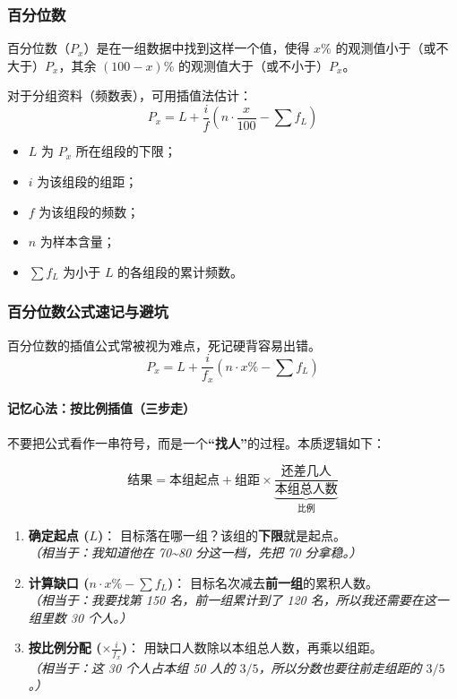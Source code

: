 \documentclass[lang=cn,10pt]{elegantbook}
\begin{document}
\subsubsection{百分位数}

百分位数（$P_x$）是在一组数据中找到这样一个值，使得 $x\%$ 的观测值小于（或不大于）$P_x$，其余 $(100-x)\%$ 的观测值大于（或不小于）$P_x$。

对于分组资料（频数表），可用插值法估计：
\begin{equation}
P_x=L+\frac{i}{f}\left(n\cdot\frac{x}{100}-\sum f_L\right)
\end{equation}

\begin{itemize}
\item $L$ 为 $P_x$ 所在组段的下限；
\item $i$ 为该组段的组距；
\item $f$ 为该组段的频数；
\item $n$ 为样本含量；
\item $\sum f_L$ 为小于 $L$ 的各组段的累计频数。
\end{itemize}

\subsubsection{百分位数公式速记与避坑}

百分位数的插值公式常被视为难点，死记硬背容易出错。
\[
P_x = L + \frac{i}{f_x} \left( n \cdot x\% - \sum f_L \right)
\]

\paragraph{记忆心法：按比例插值（三步走）}

不要把公式看作一串符号，而是一个\textbf{“找人”}的过程。本质逻辑如下：

\begin{equation*}
    \text{结果} = \textbf{本组起点} + \textbf{组距} \times \underbrace{\frac{\text{还差几人}}{\text{本组总人数}}}_{\text{比例}}
\end{equation*}

\begin{enumerate}
    \item \textbf{确定起点 ($L$)}：
    目标落在哪一组？该组的\textbf{下限}就是起点。\\
    \textit{（相当于：我知道他在 70\textasciitilde80 分这一档，先把 70 分拿稳。）}

    \item \textbf{计算缺口 ($n \cdot x\% - \sum f_L$)}：
    目标名次减去\textbf{前一组}的累积人数。\\
    \textit{（相当于：我要找第 150 名，前一组累计到了 120 名，所以我还需要在这一组里数 30 个人。）}

    \item \textbf{按比例分配 ($\times \frac{i}{f_x}$)}：
    用缺口人数除以本组总人数，再乘以组距。\\
    \textit{（相当于：这 30 个人占本组 50 人的 $3/5$，所以分数也要往前走组距的 $3/5$。）}
\end{enumerate}
\end{document}
